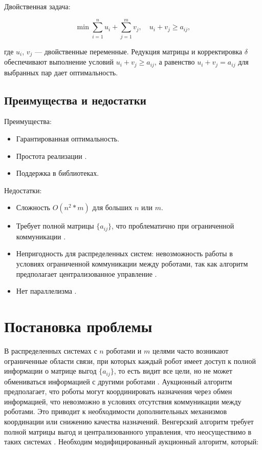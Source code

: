 Двойственная задача:

\[
\min \sum_{i=1}^n u_i + \sum_{j=1}^m v_j, \quad u_i + v_j \geq a_{ij},
\]

где \( u_i \), \( v_j \) --- двойственные переменные. Редукция матрицы и корректировка \( \delta \) обеспечивают выполнение условий \( u_i + v_j \geq a_{ij} \), а равенство \( u_i + v_j = a_{ij} \) для выбранных пар дает оптимальность.

\subsection{Преимущества и недостатки}
Преимущества:
\begin{itemize}
    \item Гарантированная оптимальность.
    \item Простота реализации \cite{emaxx2025}.
    \item Поддержка в библиотеках.
\end{itemize}

Недостатки:
\begin{itemize}
    \item Сложность \( O(n^2*m) \) для больших \( n \) или \( m \).
    \item Требует полной матрицы \( \{a_{ij}\} \), что проблематично при ограниченной коммуникации \cite{gerkey2003}.
    \item Непригодность для распределенных систем: невозможность работы в условиях ограниченной коммуникации между роботами, так как алгоритм предполагает централизованное управление \cite{kalyaev2009}.
    \item Нет параллелизма \cite{bertsekas1989}.
\end{itemize}

\section{Постановка проблемы}
В распределенных системах с \( n \) роботами и \( m \) целями часто возникают ограниченные области связи, при которых каждый робот имеет доступ к полной информации о матрице выгод \( \{a_{ij}\} \), то есть видит все цели, но не может обмениваться информацией с другими роботами \cite{gerkey2003, kalyaev2009}. Аукционный алгоритм \cite{bertsekas1990} предполагает, что роботы могут координировать назначения через обмен информацией, что невозможно в условиях отсутствия коммуникации между роботами. Это приводит к необходимости дополнительных механизмов координации или снижению качества назначений. Венгерский алгоритм \cite{kuhn1955, emaxx2025} требует полной матрицы выгод и централизованного управления, что неосуществимо в таких системах \cite{kalyaev2009}. Необходим модифицированный аукционный алгоритм, который:

